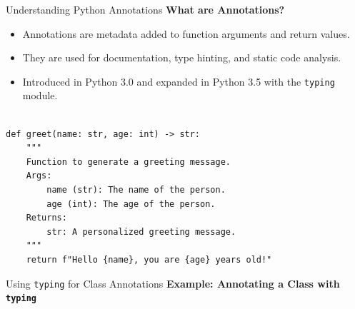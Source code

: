\documentclass[10pt]{beamer}
\let\olditem\item
\renewcommand\item{\olditem\justifying}
\begin{document}
	\begin{frame}[fragile]{Understanding Python Annotations}
		\textbf{What are Annotations?}
		\begin{itemize}
			\item Annotations are metadata added to function arguments and return values.
			\item They are used for documentation, type hinting, and static code analysis.
			\item Introduced in Python 3.0 and expanded in Python 3.5 with the \texttt{typing} module.
		\end{itemize}
		
		\begin{lstlisting}[caption=Using Annotations in Python]

def greet(name: str, age: int) -> str:
	"""
	Function to generate a greeting message.
	Args:
		name (str): The name of the person.
		age (int): The age of the person.
	Returns:
		str: A personalized greeting message.
	"""
	return f"Hello {name}, you are {age} years old!"
		\end{lstlisting}
\end{frame}
	
	
	
	
	\begin{frame}{Using \texttt{typing} for Class Annotations}
		\textbf{Example: Annotating a Class with \texttt{typing}}
		
	
		
	\end{frame}
	
\end{document}
